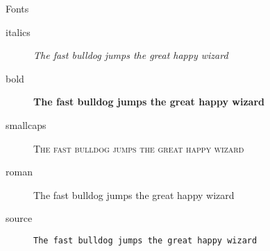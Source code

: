 \documentclass[\string~/GitHub/sthlmNordBeamerTheme/sthlmNordLightDemo.tex]{subfiles}
\begin{document}
\begin{frame}[c]{Fonts}
	\begin{description}
	\item[italics] \textit{The fast bulldog jumps the great happy wizard}
    \item[bold] \textbf{The fast bulldog jumps the great happy wizard}
    \item[smallcaps] \textsc{The fast bulldog jumps the great happy wizard}
    \item[roman] {\rmfamily The fast bulldog jumps the great happy wizard}
    \item[source] \texttt{The fast bulldog jumps the great happy wizard}
	\end{description}
\end{frame}
\end{document}

